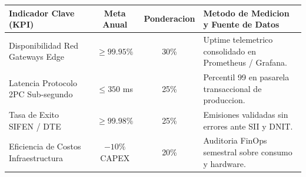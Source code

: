 \documentclass[11pt,a4paper]{article}
\begin{document}
\noindent
\begin{tabularx}{\linewidth}{@{} p{4.2cm} c c X @{}}
  \toprule
  \rowcolor{corpPrimary}
  {\bfseries\color{white}\scriptsize Indicador Clave (KPI)} &
  {\bfseries\color{white}\scriptsize Meta Anual} &
  {\bfseries\color{white}\scriptsize Ponderacion} &
  {\bfseries\color{white}\scriptsize Metodo de Medicion y Fuente de Datos} \\
  \midrule
  \rowcolor{corpLightBg}
  Disponibilidad Red Gateways Edge & $\ge 99.95\%$ & 30\% & Uptime telemetrico consolidado en Prometheus / Grafana. \\
  Latencia Protocolo 2PC Sub-segundo & $\le 350$ ms & 25\% & Percentil 99 en pasarela transaccional de produccion. \\
  \rowcolor{corpLightBg}
  Tasa de Exito SIFEN / DTE & $\ge 99.98\%$ & 25\% & Emisiones validadas sin errores ante SII y DNIT. \\
  Eficiencia de Costos Infraestructura & $-10\%$ CAPEX & 20\% & Auditoria FinOps semestral sobre consumo y hardware. \\
  \bottomrule
\end{tabularx}

\vspace{2.5mm}

\vspace{1mm}
\end{document}
